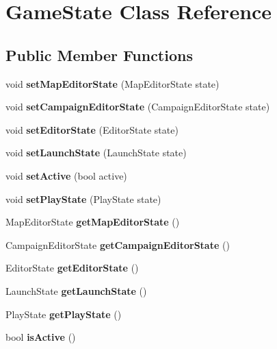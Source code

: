 \hypertarget{class_game_state}{}\section{Game\+State Class Reference}
\label{class_game_state}
\subsection*{Public Member Functions}
\begin{DoxyCompactItemize}
\item 
\hypertarget{class_game_state_a52aa15b9c112bf6bddbd1aac28d4ad88}{}\label{class_game_state_a52aa15b9c112bf6bddbd1aac28d4ad88} 
void {\bfseries set\+Map\+Editor\+State} (Map\+Editor\+State state)
\item 
\hypertarget{class_game_state_a9cb332e60c0e86369b424eb7cc7239ed}{}\label{class_game_state_a9cb332e60c0e86369b424eb7cc7239ed} 
void {\bfseries set\+Campaign\+Editor\+State} (Campaign\+Editor\+State state)
\item 
\hypertarget{class_game_state_a9534000297c35f215fb1d08112721e5c}{}\label{class_game_state_a9534000297c35f215fb1d08112721e5c} 
void {\bfseries set\+Editor\+State} (Editor\+State state)
\item 
\hypertarget{class_game_state_a97138a9485c9efd6159f6c19e055fa5a}{}\label{class_game_state_a97138a9485c9efd6159f6c19e055fa5a} 
void {\bfseries set\+Launch\+State} (Launch\+State state)
\item 
\hypertarget{class_game_state_aa771fc394545431feba185d6ef2fd650}{}\label{class_game_state_aa771fc394545431feba185d6ef2fd650} 
void {\bfseries set\+Active} (bool active)
\item 
\hypertarget{class_game_state_a50330237ac360a3afe5622ddce7449e1}{}\label{class_game_state_a50330237ac360a3afe5622ddce7449e1} 
void {\bfseries set\+Play\+State} (Play\+State state)
\item 
\hypertarget{class_game_state_adca8384a3cf8a6d77796d0244c53cb80}{}\label{class_game_state_adca8384a3cf8a6d77796d0244c53cb80} 
Map\+Editor\+State {\bfseries get\+Map\+Editor\+State} ()
\item 
\hypertarget{class_game_state_a25fb638bf3803b4e3eeb1244f47b69d3}{}\label{class_game_state_a25fb638bf3803b4e3eeb1244f47b69d3} 
Campaign\+Editor\+State {\bfseries get\+Campaign\+Editor\+State} ()
\item 
\hypertarget{class_game_state_a42a7b1a44d269c1abf60da64f5e2a550}{}\label{class_game_state_a42a7b1a44d269c1abf60da64f5e2a550} 
Editor\+State {\bfseries get\+Editor\+State} ()
\item 
\hypertarget{class_game_state_a7e693ac7e9a1c3898f2fd5a8db982773}{}\label{class_game_state_a7e693ac7e9a1c3898f2fd5a8db982773} 
Launch\+State {\bfseries get\+Launch\+State} ()
\item 
\hypertarget{class_game_state_aaa126995c9032521853d155b7df3e466}{}\label{class_game_state_aaa126995c9032521853d155b7df3e466} 
Play\+State {\bfseries get\+Play\+State} ()
\item 
\hypertarget{class_game_state_a1adfc2d4f8a3f2fd4d191309b4f5e6f3}{}\label{class_game_state_a1adfc2d4f8a3f2fd4d191309b4f5e6f3} 
bool {\bfseries is\+Active} ()
\end{DoxyCompactItemize}
